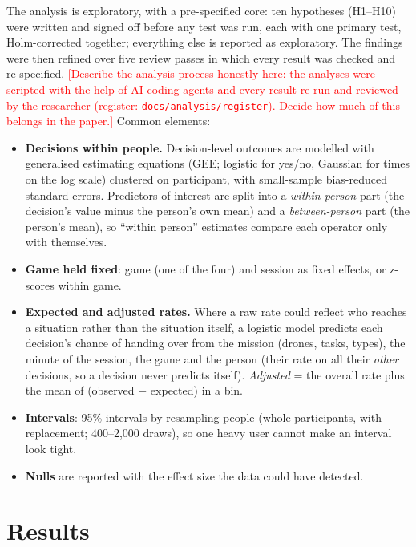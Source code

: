 \documentclass[10pt]{article}
\theoremstyle{definition}
\newcommand{\todo}[1]{\textcolor{red}{[#1]}}
\begin{document}
The analysis is exploratory, with a pre-specified core: ten hypotheses (H1--H10) were written and signed off before
any test was run, each with one primary test, Holm-corrected together; everything else is reported as exploratory.
The findings were then refined over five review passes in which every result was checked and re-specified.
\todo{Describe the analysis process honestly here: the analyses were scripted with the help of AI coding agents and
every result re-run and reviewed by the researcher (register: \texttt{docs/analysis/register}). Decide how much of
this belongs in the paper.} Common elements:
\begin{itemize}[noitemsep]
  \item \textbf{Decisions within people.} Decision-level outcomes are modelled with generalised estimating equations
        (GEE; logistic for yes/no, Gaussian for times on the log scale) clustered on participant, with small-sample
        bias-reduced standard errors. Predictors of interest are split into a \emph{within-person} part (the
        decision's value minus the person's own mean) and a \emph{between-person} part (the person's mean), so
        ``within person'' estimates compare each operator only with themselves.
  \item \textbf{Game held fixed}: game (one of the four) and session as fixed effects, or z-scores within game.
  \item \textbf{Expected and adjusted rates.} Where a raw rate could reflect who reaches a situation rather than the
        situation itself, a logistic model predicts each decision's chance of handing over from the mission (drones,
        tasks, types), the minute of the session, the game and the person (their rate on all their \emph{other}
        decisions, so a decision never predicts itself). \emph{Adjusted} = the overall rate plus the mean of
        (observed $-$ expected) in a bin.
  \item \textbf{Intervals}: 95\% intervals by resampling people (whole participants, with replacement; 400--2,000
        draws), so one heavy user cannot make an interval look tight.
  \item \textbf{Nulls} are reported with the effect size the data could have detected.
\end{itemize}

\section{Results}\label{sec:results}
\end{document}
